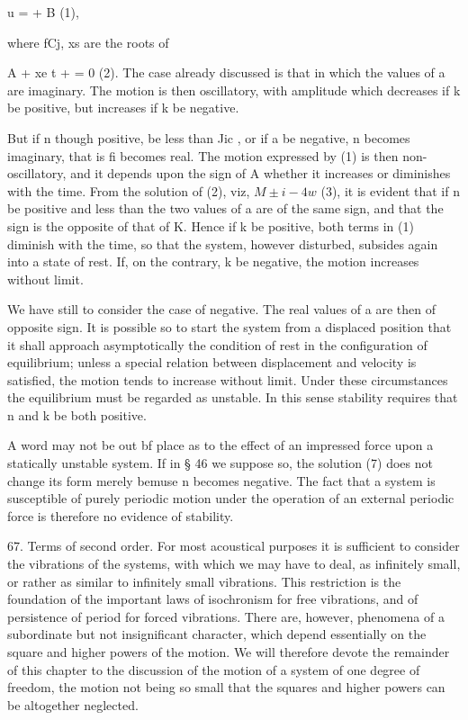 u = + B (1),

where fCj, xs are the roots of

 A + xe t + = 0 (2).  The case already discussed is that in which the values of
a are imaginary. The motion is then oscillatory, with amplitude which decreases
if k be positive, but increases if k be negative.

But if n though positive, be less than Jic , or if a be negative, n becomes
imaginary, that is fi becomes real. The motion expressed by (1) is then
non-oscillatory, and it depends upon the sign of A whether it increases or
diminishes with the time. From the solution of (2), viz, \( M \pm i - 4w \)
(3), it is evident that if n be positive and less than the two values of a are
of the same sign, and that the sign is the opposite of that of K. Hence if k be
positive, both terms in (1) diminish with the time, so that the system, however
disturbed, subsides again into a state of rest. If, on the contrary, k be
negative, the motion increases without limit.

We have still to consider the case of negative. The real values of a are then
of opposite sign. It is possible so to start the system from a displaced
position that it shall approach asymptotically the condition of rest in the
configuration of equilibrium; unless a special relation between displacement
and velocity is satisfied, the motion tends to increase without limit. Under
these circumstances the equilibrium must be regarded as unstable. In this sense
stability requires that n and k be both positive.

A word may not be out bf place as to the effect of an impressed force upon a
statically unstable system. If in § 46 we suppose so, the solution (7) does not
change its form merely bemuse n becomes negative. The fact that a system is
susceptible of purely periodic motion under the operation of an external
periodic force is therefore no evidence of stability.

67. Terms of second order.
For most acoustical purposes it is sufficient to consider the vibrations of
the systems, with which we may have to deal, as infinitely small, or rather as
similar to infinitely small vibrations.  This restriction is the foundation of
the important laws of isochronism for free vibrations, and of persistence of
period for forced vibrations.  There are, however, phenomena of a subordinate
but not insignificant character, which depend essentially on the square and
higher powers of the motion. We will therefore devote the remainder of this
chapter to the discussion of the motion of a system of one degree of freedom,
the motion not being so small that the squares and higher powers can be
altogether neglected.

